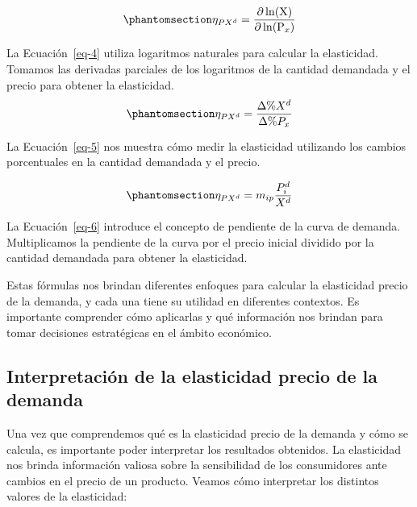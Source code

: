 \documentclass[
  jou,
  floatsintext,
  longtable,
  a4paper,
  nolmodern,
  notxfonts,
  notimes,
  colorlinks=true,linkcolor=blue,citecolor=blue,urlcolor=blue]{apa7}
\begin{document}
\begin{equation}\phantomsection\label{eq-4}{
\eta _{PX^d} = \frac{\partial \ln(\mathrm X)}{\partial  \ln(\mathrm P_x)}
}\end{equation}

La Ecuación~\ref{eq-4} utiliza logaritmos naturales para calcular la
elasticidad. Tomamos las derivadas parciales de los logaritmos de la
cantidad demandada y el precio para obtener la elasticidad.
\begin{equation}\phantomsection\label{eq-5}{
\eta _{PX^d} = \frac{\Delta \% X^d}{\Delta \% P_x}
}\end{equation}

La Ecuación~\ref{eq-5} nos muestra cómo medir la elasticidad utilizando
los cambios porcentuales en la cantidad demandada y el precio.

\begin{equation}\phantomsection\label{eq-6}{
\eta_{PX^d} = m_{ip} \frac{P_i^d}{X^d}
}\end{equation}

La Ecuación~\ref{eq-6} introduce el concepto de pendiente de la curva de
demanda. Multiplicamos la pendiente de la curva por el precio inicial
dividido por la cantidad demandada para obtener la elasticidad.

Estas fórmulas nos brindan diferentes enfoques para calcular la
elasticidad precio de la demanda, y cada una tiene su utilidad en
diferentes contextos. Es importante comprender cómo aplicarlas y qué
información nos brindan para tomar decisiones estratégicas en el ámbito
económico.

\subsection{Interpretación de la elasticidad precio de la
demanda}\label{interpretaciuxf3n-de-la-elasticidad-precio-de-la-demanda}

Una vez que comprendemos qué es la elasticidad precio de la demanda y
cómo se calcula, es importante poder interpretar los resultados
obtenidos. La elasticidad nos brinda información valiosa sobre la
sensibilidad de los consumidores ante cambios en el precio de un
producto. Veamos cómo interpretar los distintos valores de la
elasticidad:
\end{document}
